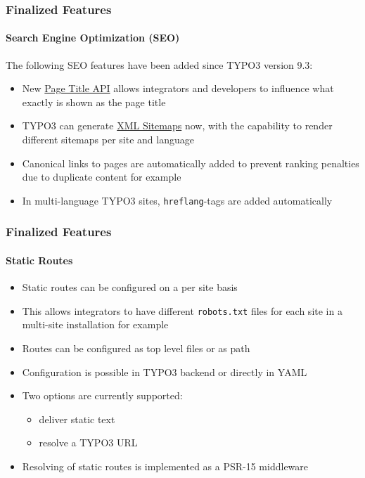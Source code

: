 \begin{frame}[fragile]
	\frametitle{Finalized Features}
	\framesubtitle{Search Engine Optimization (SEO)}

	\small
		The following SEO features have been added since TYPO3 version 9.3:
	\normalsize

	\begin{itemize}
		\item New
			\href{https://docs.typo3.org/typo3cms/CoreApiReference/ApiOverview/PageTitleApi/Index.html}{Page Title API}
			allows integrators and developers to influence
			what exactly is shown as the page title
		\item TYPO3 can generate
			\href{https://docs.typo3.org/typo3cms/CoreApiReference/ApiOverview/XmlSitemap/Index.html}{XML Sitemaps}
			now, with the capability to render different sitemaps per site and
			language
		\item Canonical links to pages are automatically added to prevent
			ranking penalties due to duplicate content for example
		\item In multi-language TYPO3 sites, \texttt{hreflang}-tags are added
			automatically
	\end{itemize}

\end{frame}


\begin{frame}[fragile]
	\frametitle{Finalized Features}
	\framesubtitle{Static Routes}

	\begin{itemize}
		\item Static routes can be configured on a per site basis
		\item This allows integrators to have different \texttt{robots.txt}
			files for each site in a multi-site installation for example
		\item Routes can be configured as top level files or as path
		\item Configuration is possible in TYPO3 backend or directly in YAML
		\item Two options are currently supported:
			\begin{itemize}
				\item deliver static text
				\item resolve a TYPO3 URL
			\end{itemize}
		\item Resolving of static routes is implemented as a PSR-15 middleware
	\end{itemize}

\end{frame}

